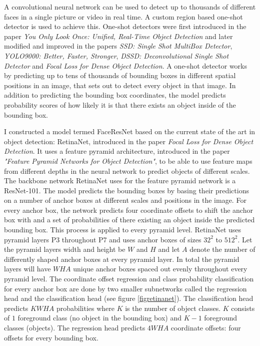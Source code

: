 \documentclass[a4paper, twoside]{article}
\begin{document}
A convolutional neural network can be used to detect up to thousands of different faces in a single picture or video in real time. A custom region based one-shot detector is used to achieve this. One-shot detectors were first introduced in the paper \textit{You Only Look Once: Unified, Real-Time Object Detection} and later modified and improved in the papers \textit{SSD: Single Shot MultiBox Detector}, \textit{YOLO9000: Better, Faster, Stronger}, \textit{DSSD: Deconvolutional Single Shot Detector} and \textit{Focal Loss for Dense Object Detection}. A one-shot detector works by predicting up to tens of thousands of bounding boxes in different spatial positions in an image, that sets out to detect every object in that image. In addition to predicting the bounding box coordinates, the model predicts probability scores of how likely it is that there exists an object inside of the bounding box. \cite{yolo} \cite{ssd} \cite{yolo9000} \cite{dssd} \cite{retinanet}

I constructed a model termed FaceResNet based on the current state of the art in object detection: RetinaNet, introduced in the paper \textit{Focal Loss for Dense Object Detection}. It uses a feature pyramid architecture, introduced in the paper \textit{"Feature Pyramid Networks for Object Detection"}, to be able to use feature maps from different depths in the neural network to predict objects of different scales. The backbone network RetinaNet uses for the feature pyramid network is a ResNet-101. The model predicts the bounding boxes by basing their predictions on a number of anchor boxes at different scales and positions in the image. For every anchor box, the network predicts four coordinate offsets to shift the anchor box with and a set of probabilities of there existing an object inside the predicted bounding box. This process is applied to every pyramid level. RetinaNet uses pyramid layers P3 throughout P7 and uses anchor boxes of sizes $32^2$ to $512^2$. Let the pyramid layers width and height be $W$ and $H$ and let $A$ denote the number of differently shaped anchor boxes at every pyramid layer. In total the pyramid layers will have $WHA$ unique anchor boxes spaced out evenly throughout every pyramid level. The coordinate offset regression and class probability classification for every anchor box are done by two smaller subnetworks called the regression head and the classification head (see figure \ref{figretinanet}). The classification head predicts $KWHA$ probabilities where $K$ is the number of object classes. $K$ consists of $1$ foreground class (no object in the bounding box) and $K-1$ foreground classes (objects). The regression head predicts $4WHA$ coordinate offsets: four offsets for every bounding box. \cite{retinanet} \cite{fpn} \cite{resnet}
\end{document}
